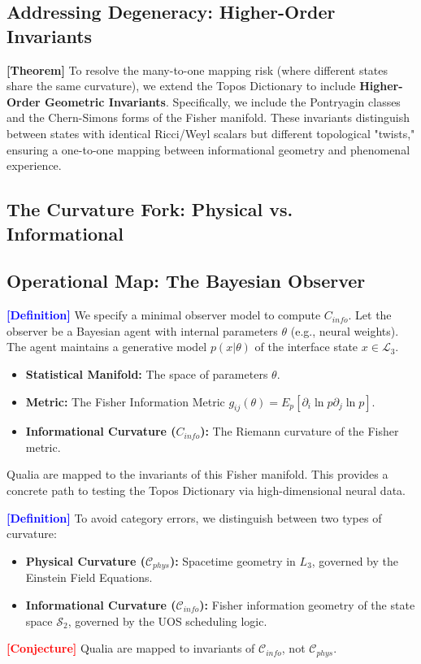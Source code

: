 \documentclass[11pt,titlepage]{article}
\newcommand{\interface}{\mathcal{L}_3}
\newcommand{\curvature}{\mathcal{C}}
\newcommand{\tagdef}{\textcolor{blue}{\textbf{[Definition]}} }
\newcommand{\tagtheo}{\textcolor{green!60!black}{\textbf{[Theorem]}} }
\newcommand{\tagconj}{\textcolor{red}{\textbf{[Conjecture]}} }
\begin{document}
\subsection{Addressing Degeneracy: Higher-Order Invariants}
\tagtheo To resolve the many-to-one mapping risk (where different states share the same curvature), we extend the Topos Dictionary to include \textbf{Higher-Order Geometric Invariants}. Specifically, we include the Pontryagin classes and the Chern-Simons forms of the Fisher manifold. These invariants distinguish between states with identical Ricci/Weyl scalars but different topological "twists," ensuring a one-to-one mapping between informational geometry and phenomenal experience.


\subsection{The Curvature Fork: Physical vs. Informational}

\subsection{Operational Map: The Bayesian Observer}
\tagdef We specify a minimal observer model to compute $C_{info}$. Let the observer be a Bayesian agent with internal parameters $\theta$ (e.g., neural weights). The agent maintains a generative model $p(x | \theta)$ of the interface state $x \in \interface$.
\begin{itemize}
    
\item \textbf{Statistical Manifold:} The space of parameters $\theta$.
    
\item \textbf{Metric:} The Fisher Information Metric $g_{ij}(\theta) = E_p [\partial_i \ln p \partial_j \ln p]$.
    
\item \textbf{Informational Curvature ($C_{info}$):} The Riemann curvature of the Fisher metric.
\end{itemize}
Qualia are mapped to the invariants of this Fisher manifold. This provides a concrete path to testing the Topos Dictionary via high-dimensional neural data.

\tagdef To avoid category errors, we distinguish between two types of curvature:
\begin{itemize}
    
\item \textbf{Physical Curvature ($\curvature_{phys}$):} Spacetime geometry in $L_3$, governed by the Einstein Field Equations.
    
\item \textbf{Informational Curvature ($\curvature_{info}$):} Fisher information geometry of the state space $\mathcal{S}_2$, governed by the UOS scheduling logic.
\end{itemize}
\tagconj Qualia are mapped to invariants of $\curvature_{info}$, not $\curvature_{phys}$.
\end{document}
